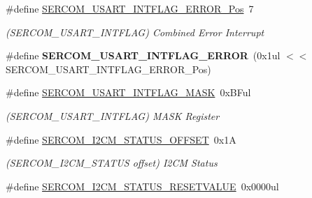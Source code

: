 \begin{DoxyCompactItemize}
\item 
\hypertarget{group___s_a_m_l21___s_e_r_c_o_m_gaa5be9b8818225408ec458f9a32b0bde0}{}\#define \hyperlink{group___s_a_m_l21___s_e_r_c_o_m_gaa5be9b8818225408ec458f9a32b0bde0}{S\+E\+R\+C\+O\+M\+\_\+\+U\+S\+A\+R\+T\+\_\+\+I\+N\+T\+F\+L\+A\+G\+\_\+\+E\+R\+R\+O\+R\+\_\+\+Pos}~7\label{group___s_a_m_l21___s_e_r_c_o_m_gaa5be9b8818225408ec458f9a32b0bde0}

\begin{DoxyCompactList}\small\item\em (S\+E\+R\+C\+O\+M\+\_\+\+U\+S\+A\+R\+T\+\_\+\+I\+N\+T\+F\+L\+A\+G) Combined Error Interrupt \end{DoxyCompactList}\item 
\hypertarget{group___s_a_m_l21___s_e_r_c_o_m_ga65a043f1f4fb8f5ea0f7b63ac3b5fef5}{}\#define {\bfseries S\+E\+R\+C\+O\+M\+\_\+\+U\+S\+A\+R\+T\+\_\+\+I\+N\+T\+F\+L\+A\+G\+\_\+\+E\+R\+R\+O\+R}~(0x1ul $<$$<$ S\+E\+R\+C\+O\+M\+\_\+\+U\+S\+A\+R\+T\+\_\+\+I\+N\+T\+F\+L\+A\+G\+\_\+\+E\+R\+R\+O\+R\+\_\+\+Pos)\label{group___s_a_m_l21___s_e_r_c_o_m_ga65a043f1f4fb8f5ea0f7b63ac3b5fef5}

\item 
\hypertarget{group___s_a_m_l21___s_e_r_c_o_m_gaf8b9fdb41c3fea2e45b096b7a369b542}{}\#define \hyperlink{group___s_a_m_l21___s_e_r_c_o_m_gaf8b9fdb41c3fea2e45b096b7a369b542}{S\+E\+R\+C\+O\+M\+\_\+\+U\+S\+A\+R\+T\+\_\+\+I\+N\+T\+F\+L\+A\+G\+\_\+\+M\+A\+S\+K}~0x\+B\+Ful\label{group___s_a_m_l21___s_e_r_c_o_m_gaf8b9fdb41c3fea2e45b096b7a369b542}

\begin{DoxyCompactList}\small\item\em (S\+E\+R\+C\+O\+M\+\_\+\+U\+S\+A\+R\+T\+\_\+\+I\+N\+T\+F\+L\+A\+G) M\+A\+S\+K Register \end{DoxyCompactList}\item 
\hypertarget{group___s_a_m_l21___s_e_r_c_o_m_gac51f2c98aeb1164b1913f0c93d8ac864}{}\#define \hyperlink{group___s_a_m_l21___s_e_r_c_o_m_gac51f2c98aeb1164b1913f0c93d8ac864}{S\+E\+R\+C\+O\+M\+\_\+\+I2\+C\+M\+\_\+\+S\+T\+A\+T\+U\+S\+\_\+\+O\+F\+F\+S\+E\+T}~0x1\+A\label{group___s_a_m_l21___s_e_r_c_o_m_gac51f2c98aeb1164b1913f0c93d8ac864}

\begin{DoxyCompactList}\small\item\em (S\+E\+R\+C\+O\+M\+\_\+\+I2\+C\+M\+\_\+\+S\+T\+A\+T\+U\+S offset) I2\+C\+M Status \end{DoxyCompactList}\item 
\hypertarget{group___s_a_m_l21___s_e_r_c_o_m_ga156623b8470f6f8d4e8790684776c257}{}\#define \hyperlink{group___s_a_m_l21___s_e_r_c_o_m_ga156623b8470f6f8d4e8790684776c257}{S\+E\+R\+C\+O\+M\+\_\+\+I2\+C\+M\+\_\+\+S\+T\+A\+T\+U\+S\+\_\+\+R\+E\+S\+E\+T\+V\+A\+L\+U\+E}~0x0000ul\label{group___s_a_m_l21___s_e_r_c_o_m_ga156623b8470f6f8d4e8790684776c257}


\end{DoxyCompactItemize}
